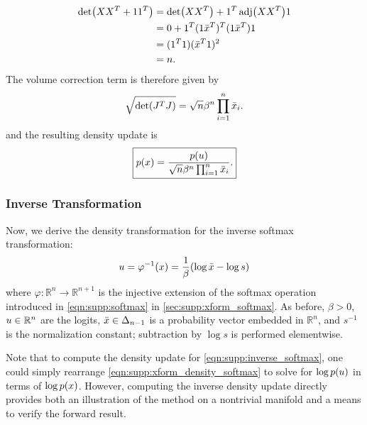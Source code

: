 \begin{align*}
    \Det{ \vv{X} \vv{X}^T + \One \One^T }
     & = \Det{ \vv{X} \vv{X}^T } + \One^T \Adj{ \vv{X} \vv{X}^T } \One \\
     & = 0 + \One^T (\One \vv{\bar{x}}^T)^T (\One \vv{\bar{x}}^T) \One \\
     & = (\One^T \One) ( \vv{\bar{x}}^T \One )^2                       \\
     & = n.
\end{align*}
The volume correction term is therefore given by
\begin{align}\label{eqn:supp:volume_corr_softmax}
    \sqrt{\Det{ \vv{J}^T \vv{J} }} = \sqrt{n} \beta^{n} \prod_{i=1}^{n} \vv{\bar{x}}_i.
\end{align}
and the resulting density update is
\begin{align}\label{eqn:supp:xform_density_softmax}
    \boxed{p(x) = \frac{p(u)}{\sqrt{n} \beta^n \prod_{i=1}^{n} \bar{x}_i}.}
\end{align}

\subsubsection{Inverse Transformation}\label{sec:supp:xform_inverse_softmax}

Now, we derive the density transformation for the inverse softmax transformation:
\begin{align}\label{eqn:supp:inverse_softmax}
    u = \varphi^{-1}(x) = \frac{1}{\beta} (\log \bar{x} - \log s)
\end{align}
where $\varphi : \mathbb{R}^{n} \to \mathbb{R}^{n+1}$ is the injective extension of the softmax operation introduced in \cref{eqn:supp:softmax} in \cref{sec:supp:xform_softmax}.
As before, $\beta > 0$, $u \in \mathbb{R}^{n}$ are the logits, $\bar{x} \in \Delta_{n-1}$ is a probability vector embedded in $\mathbb{R}^{n}$, and $s^{-1}$ is the normalization constant;
subtraction by $\log s$ is performed elementwise.

Note that to compute the density update for \eqref{eqn:supp:inverse_softmax}, one could simply rearrange \eqref{eqn:supp:xform_density_softmax} to solve for $\log p(u)$ in terms of $\log p(x)$.
However, computing the inverse density update directly provides both an illustration of the method on a nontrivial manifold and a means to verify the forward result.

